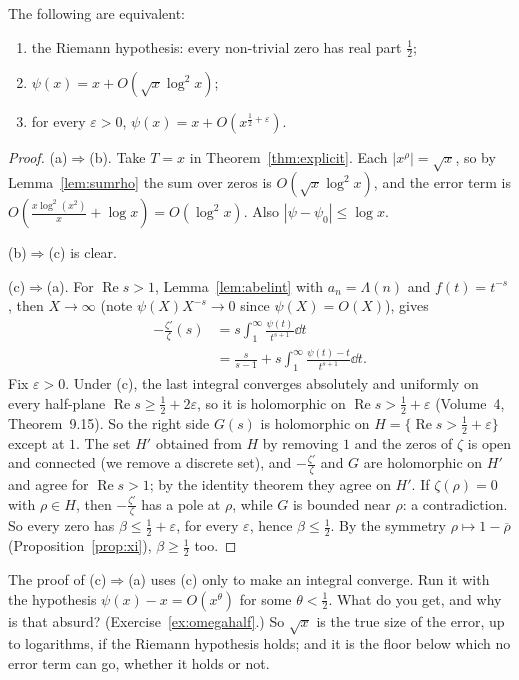 \begin{theorem}\label{thm:rhequiv}
The following are equivalent:
\begin{enumerate}[label=(\alph*)]
\item the Riemann hypothesis: every non-trivial zero has real part $\frac12$;
\item $\psi(x)=x+O(\sqrt x\log^2x)$;
\item for every $\varepsilon>0$, $\psi(x)=x+O(x^{\frac12+\varepsilon})$.
\end{enumerate}
\end{theorem}
\begin{proof}
(a)$\Rightarrow$(b). Take $T=x$ in Theorem~\ref{thm:explicit}. Each $|x^\rho|=\sqrt x$, so by Lemma~\ref{lem:sumrho} the sum over zeros is $O(\sqrt x\log^2x)$, and the error term is
$O(\frac{x\log^2(x^2)}x+\log x)=O(\log^2x)$. Also $|\psi-\psi_0|\le\log x$.

(b)$\Rightarrow$(c) is clear.

(c)$\Rightarrow$(a). For $\operatorname{Re}s>1$, Lemma~\ref{lem:abelint} with $a_n=\Lambda(n)$ and $f(t)=t^{-s}$, then $X\to\infty$ (note $\psi(X)X^{-s}\to0$ since $\psi(X)=O(X)$), gives
\[
\begin{aligned}-\frac{\zeta'}\zeta(s)&=s\int_1^\infty\frac{\psi(t)}{t^{s+1}}\dd t\\&=\frac s{s-1}+s\int_1^\infty\frac{\psi(t)-t}{t^{s+1}}\dd t.\end{aligned}
\]
Fix $\varepsilon>0$. Under (c), the last integral converges absolutely and uniformly on every half-plane $\operatorname{Re}s\ge\frac12+2\varepsilon$, so it is holomorphic on $\operatorname{Re}s>\frac12+\varepsilon$ (Volume~4,
Theorem~9.15). So the right side $G(s)$ is holomorphic on $H=\{\operatorname{Re}s>\frac12+\varepsilon\}$ except at $1$. The set $H'$ obtained from $H$ by removing $1$ and the zeros of $\zeta$ is open and connected (we
remove a discrete set), and $-\frac{\zeta'}\zeta$ and $G$ are holomorphic on $H'$ and agree for $\operatorname{Re}s>1$; by the identity theorem they agree on $H'$. If $\zeta(\rho)=0$ with $\rho\in H$, then $-\frac{\zeta'}\zeta$
has a pole at $\rho$, while $G$ is bounded near $\rho$: a contradiction. So every zero has $\beta\le\frac12+\varepsilon$, for every $\varepsilon$, hence $\beta\le\frac12$. By the symmetry $\rho\mapsto1-\overline\rho$ (Proposition~\ref{prop:xi}),
$\beta\ge\frac12$ too.
\end{proof}

\begin{think}
The proof of (c)$\Rightarrow$(a) uses (c) only to make an integral converge. Run it with the hypothesis $\psi(x)-x=O(x^\theta)$ for some $\theta<\frac12$. What do you get, and why is that absurd?
(Exercise~\ref{ex:omegahalf}.) So $\sqrt x$ is the true size of the error, up to logarithms, if the Riemann hypothesis holds; and it is the floor below which no error term can go, whether it holds or not.
\end{think}

